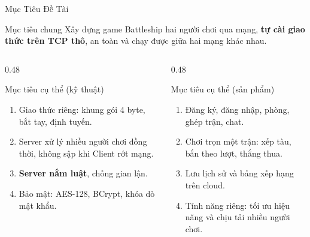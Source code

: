 \begin{frame}[label=mt]{Mục Tiêu Đề Tài}
  \begin{block}{Mục tiêu chung}
    Xây dựng game Battleship hai người chơi qua mạng, \textbf{tự cài giao thức trên TCP thô}, an toàn và chạy được giữa hai mạng khác nhau.
  \end{block}
  \begin{columns}[T]
    \begin{column}{0.48\textwidth}
      \begin{exampleblock}{Mục tiêu cụ thể (kỹ thuật)}
        \begin{enumerate}\setlength{\itemsep}{0pt}
          \item Giao thức riêng: khung gói 4 byte, bắt tay, định tuyến.
          \item Server xử lý nhiều người chơi đồng thời, không sập khi Client rớt mạng.
          \item \textbf{Server nắm luật}, chống gian lận.
          \item Bảo mật: AES-128, BCrypt, khóa dò mật khẩu.
        \end{enumerate}
      \end{exampleblock}
    \end{column}
    \begin{column}{0.48\textwidth}
      \begin{exampleblock}{Mục tiêu cụ thể (sản phẩm)}
        \begin{enumerate}\setlength{\itemsep}{0pt}
          \item Đăng ký, đăng nhập, phòng, ghép trận, chat.
          \item Chơi trọn một trận: xếp tàu, bắn theo lượt, thắng thua.
          \item Lưu lịch sử và bảng xếp hạng trên cloud.
          \item Tính năng riêng: tối ưu hiệu năng và chịu tải nhiều người chơi.
        \end{enumerate}
      \end{exampleblock}
    \end{column}
  \end{columns}
\end{frame}

